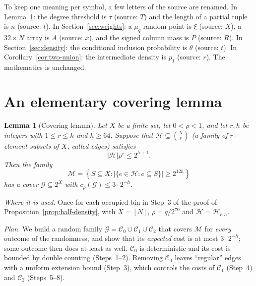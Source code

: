 \documentclass[11pt,letterpaper]{article}
\newtheorem{lemma}[theorem]{Lemma}
\theoremstyle{definition}
\theoremstyle{remark}
\numberwithin{equation}{section}
\begin{document}
To keep one meaning per symbol, a few letters of the source are renamed.
In Lemma~\ref{lem:covering}: the degree threshold is $\tau$ (source: $T$)
and the length of a partial tuple is $n$ (source: $t$). In
Section~\ref{sec:weights}: a $\mu_q$-random point is $\xi$ (source: $X$),
a $32\times N$ array is $A$ (source: $x$), and the signed column mass is
$\widetilde P$ (source: $R$). In Section~\ref{sec:density}: the conditional
inclusion probability is $\theta$ (source: $t$). In
Corollary~\ref{cor:two-union}: the intermediate density is $p_1$
(source: $r$). The mathematics is unchanged.

\section{An elementary covering lemma}
\label{sec:covering}

\begin{lemma}[Covering lemma]\label{lem:covering}
Let \(X\) be a finite set, let \(0<\rho<1\), and let \(r,h\) be integers
with \(1\le r\le h\) and \(h\ge64\). Suppose that
\(\mathcal H\subseteq\binom{X}{r}\) (a family of $r$-element subsets of $X$,
called \emph{edges}) satisfies
\[
|\mathcal H|\rho^r\le2^{h+1}.
\]
Then the family
\[
\mathcal M=\left\{S\subseteq X:
  |\{e\in\mathcal H:e\subseteq S\}|\ge2^{12h}\right\}
\]
has a cover \(\mathcal G\subseteq2^X\) with
\(c_\rho(\mathcal G)\le3\cdot2^{-h}\).
\end{lemma}

\emph{Where it is used.} Once for each occupied bin in Step~3 of the proof
of Proposition~\ref{prop:half-density}, with $X=[N]$, $\rho=q/2^{70}$ and
$\mathcal H=\mathcal H_{r,h}$.

\emph{Plan.} We build a random family
$\mathcal G=\mathcal C_0\cup\mathcal C_1\cup\mathcal C_2$ that covers
$\mathcal M$ for \emph{every} outcome of the randomness, and show that its
\emph{expected} cost is at most $3\cdot2^{-h}$; some outcome then does at
least as well. $\mathcal C_0$ is deterministic and its cost is bounded by
double counting (Steps~1--2). Removing $\mathcal C_0$ leaves ``regular''
edges with a uniform extension bound (Step~3), which controls the costs of
$\mathcal C_1$ (Step~4) and $\mathcal C_2$ (Steps~5--8).
\end{document}
